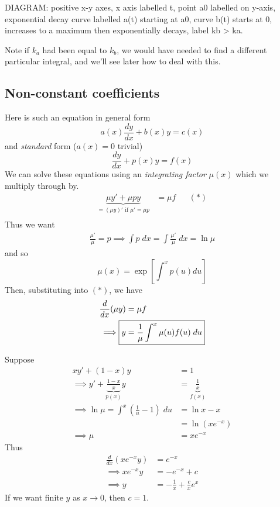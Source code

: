\documentclass{../../template/note}
\begin{document}
    DIAGRAM: positive x-y axes, x axis labelled t, point a0 labelled on y-axis, exponential decay curve labelled a(t) starting at a0, curve b(t) starts at 0, increases to a maximum then exponentially decays, label kb > ka.

    Note if \(k_a\) had been equal to \(k_b\), we would have needed to find a different particular integral, and we'll see later how to deal with this.
    
    \subsection{Non-constant coefficients}

    Here is such an equation in general form
    \[  
        a(x)\frac{dy}{dx} + b(x)y = c(x)
    \]
    and \emph{standard} form (\(a(x) = 0\) trivial)
    \[  
        \frac{dy}{dx} + p(x)y = f(x)
    \]
    We can solve these equations using an \emph{integrating factor} \(\mu(x)\) which we multiply through by.
    \begin{align*}
        \underbrace{\mu y' + \mu p y}_{\displaystyle =(\mu y)' \text{ if } \mu' = \mu p} &= \mu f && (*) \\
    \end{align*}
    Thus we want
    \begin{align*}
        \frac{\mu'}{\mu} = p \implies \int p \; dx = \int \frac{\mu'}{\mu} \; dx = \ln \mu
    \end{align*}
    and so
    \[
        \mu(x) = \exp\left[\int^x p(u) du\right]
    \]
    Then, substituting into \((*)\), we have
    \begin{align*}
        \frac{d}{dx}(\mu y) &= \mu f \\
        \implies \Aboxed{y &= \frac{1}{\mu} \int^x \mu(u)f(u) \; du}
    \end{align*}
    
    \begin{example}
        Suppose
        \begin{align*}
            xy' + (1-x)y &= 1 \\
            \implies y' + \underbrace{\frac{1-x}{x}}_{p(x)}y &= \underbrace{\frac{1}{x}}_{f(x)} \\
            \implies \ln \mu = \int^x \left(\frac 1 u - 1\right) \; du &= \ln x - x \\
            &= \ln(xe^{-x}) \\
            \implies \mu &= xe^{-x}
        \end{align*}
        Thus
        \begin{align*}
            \frac{d}{dx}\left(xe^{-x} y\right) &= e^{-x} \\
            \implies xe^{-x}y &= -e^{-x} + c \\
            \implies y &= -\frac 1 x + \frac c x e^x
        \end{align*}
        If we want finite \(y\) as \(x \to 0\), then \(c = 1\).
    \end{example}
\end{document}
